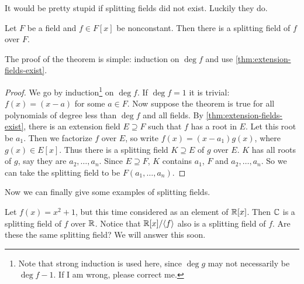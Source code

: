 \documentclass[oneside]{book}
\begin{document}
It would be pretty stupid if splitting fields did not exist. Luckily they do.
\begin{theorem}
    Let $F$ be a field and $f \in F[x]$ be nonconstant. Then there is a
    splitting field of $f$ over $F$.
\end{theorem}
The proof of the theorem is simple: induction on $\deg f$ and use
\cref{thm:extension-fields-exist}.
\begin{proof}
    We go by induction\footnote{Note that strong induction is used here, since
    $\deg g$ may not necessarily be $\deg f - 1$. If I am wrong, please correct
    me.} on $\deg f$. If $\deg f = 1$ it is trivial: $f(x) = (x-a)$ for some $a
    \in F$. Now suppose the theorem is true for all polynomials of degree less
    than $\deg f$ and all fields. By \cref{thm:extension-fields-exist}, there is
    an extension field $E \supseteq F$ such that $f$ has a root in $E$. Let this
    root be $a_1$. Then we factorize $f$ over $E$, so write $f(x) = (x-a_1)
    g(x)$, where $g(x) \in E[x]$. Thus there is a splitting field $K \supseteq
    E$ of $g$ over $E$. $K$ has all roots of $g$, say they are $a_2, \dots,
    a_n$. Since $E \supseteq F$, $K$ contains $a_1$, $F$ and $a_2, \dots, a_n$.
    So we can take the splitting field to be $F(a_1, \dots, a_n)$.
\end{proof}

Now we can finally give some examples of splitting fields.

\begin{example}
    Let $f(x) = x^2 + 1$, but this time considered as an element of $\mathbb{R}[x]$.
    Then $\mathbb{C}$ is a splitting field of $f$ over $\mathbb{R}$. Notice that $\mathbb{R}[x] /
    { \langle f \rangle }$ also is a splitting field of $f$. Are these the same splitting
    field? We will answer this soon.
\end{example}

\backmatter
{}
\nocite{*}
\printbibliography
\end{document}
